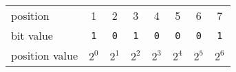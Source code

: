 \begin{tabular}{l|ccccccc} \hline
position       & 1          & 2          & 3          & 4          & 5          & 6          & 7 \\
bit value      & \texttt{1} & \texttt{0} & \texttt{1} & \texttt{0} & \texttt{0} & \texttt{0} & \texttt{1} \\
position value & $2^0$      & $2^1$      & $2^2$      & $2^3$      & $2^4$      & $2^5$      & $2^6$ \\\hline
\end{tabular}


